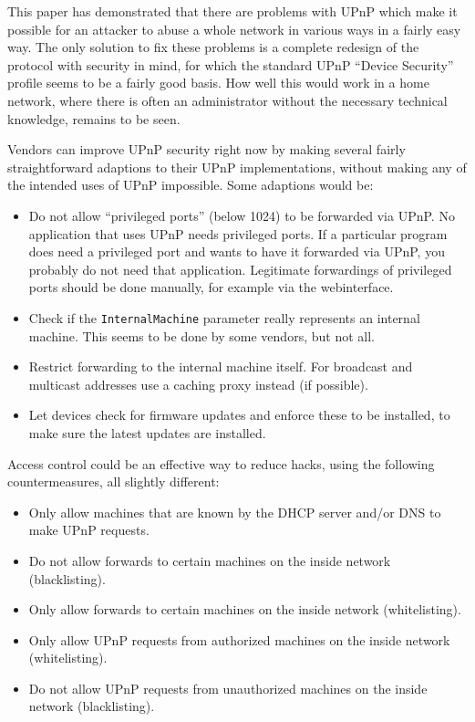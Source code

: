 \documentclass[10pt]{article}
\begin{document}
This paper has demonstrated that there are problems with UPnP which make it
possible for an attacker to abuse a whole network in various ways in a
fairly easy way. The only solution to fix these problems is a complete
redesign of the protocol with security in mind, for which the standard UPnP
``Device Security'' profile seems to be a fairly good basis. How well this
would work in a home network, where there is often an administrator without
the necessary technical knowledge, remains to be seen.

Vendors can improve UPnP security right now by making several fairly
straightforward adaptions to their UPnP implementations, without making
any of the intended uses of UPnP impossible. Some adaptions would be:

\begin{itemize}

\item Do not allow ``privileged ports'' (below 1024) to be forwarded via UPnP.
No application that uses UPnP needs privileged ports. If a particular program
does need a privileged port and wants to have it forwarded via UPnP, you
probably do not need that application. Legitimate forwardings of privileged
ports should be done manually, for example via the webinterface.

\item Check if the \texttt{InternalMachine} parameter really represents an
internal machine. This seems to be done by some vendors, but not all.

\item Restrict forwarding to the internal machine itself. For broadcast and
multicast addresses use a caching proxy instead (if possible).

\item Let devices check for firmware updates and enforce these to be
installed, to make sure the latest updates are installed.

\end{itemize}

Access control could be an effective way to reduce hacks, using the following
countermeasures, all slightly different:

\begin{itemize}
\item Only allow machines that are known by the DHCP server and/or DNS
to make UPnP requests.

\item Do not allow forwards to certain machines on the inside network (blacklisting).

\item Only allow forwards to certain machines on the inside network (whitelisting).

\item Only allow UPnP requests from authorized machines on the inside network (whitelisting).

\item Do not allow UPnP requests from unauthorized machines on the inside network (blacklisting).

\end{itemize}
\end{document}
